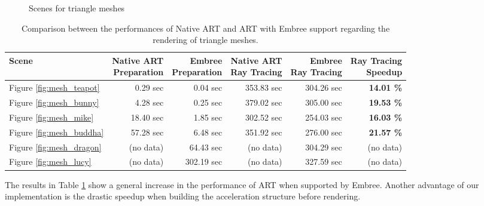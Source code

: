 \begin{figure}
	\hfill
	
	\caption{Scenes for triangle meshes}
	\label{fig:mesh_scenes}
\end{figure}


\begin{table}
	\centering
	{\footnotesize\sf
		\begin{tabular}{lrrrrr}
			\toprule
			Scene  & \thead{Native ART \\ Preparation} & \thead{Embree \\ Preparation}  & \thead{Native ART \\ Ray Tracing} & \thead{Embree \\ Ray Tracing} &  \thead{Ray Tracing \\ Speedup}\\ 
			\midrule
			Figure \ref{fig:mesh_teapot} & 0.29 sec & 0.04 sec & 353.83 sec & 304.26 sec &  \textbf{14.01 \%} \\
			Figure \ref{fig:mesh_bunny}  & 4.28 sec & 0.25 sec & 379.02 sec & 305.00 sec &  \textbf{19.53 \%} \\
			Figure \ref{fig:mesh_mike} & 18.40 sec & 1.85 sec &  302.52 sec & 254.03 sec &  \textbf{16.03 \%}  \\
			\addlinespace %
			Figure \ref{fig:mesh_buddha}  & 57.28 sec & 6.48 sec & 351.92 sec & 276.00 sec &  \textbf{ 21.57 \%} \\
			Figure \ref{fig:mesh_dragon} & (no data)  & 64.43 sec & (no data) & 304.29 sec & (no data)  \\
			Figure \ref{fig:mesh_lucy}  & (no data) & 302.19 sec & (no data) & 327.59 sec & (no data)  \\
			\bottomrule
	\end{tabular}}
	\caption{Comparison between the performances of Native ART and ART with Embree support regarding the rendering of triangle meshes.}
	\label{tab:mesh}
\end{table}

The results in Table \ref{tab:mesh} show a general increase in the performance of ART when supported by Embree. Another advantage of our implementation is the drastic speedup when building the acceleration structure before rendering.

